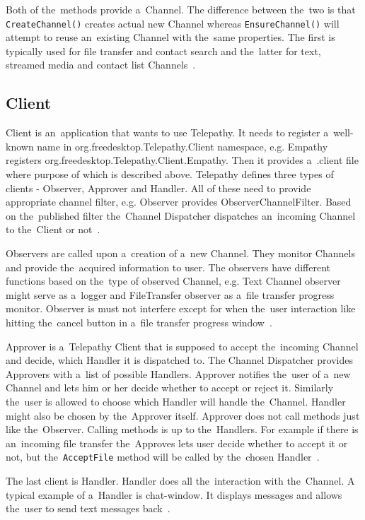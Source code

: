 Both of the~methods provide a~Channel. The difference between the~two is that \verb|CreateChannel()| creates actual new Channel whereas \verb|EnsureChannel()| will attempt to reuse an~existing Channel with the~same properties. The first is typically used for file transfer and contact search and the~latter for text, streamed media and contact list Channels~\cite{TPWiki}.

\subsection*{Client}\label{subsect:tpClient}
Client is an~application that wants to use Telepathy. It needs to register a~well-known name in org.freedesktop.Telepathy.Client namespace, e.g. Empathy registers \newline org.freedesktop.Telepathy.Client.Empathy. Then it provides a~.client file where purpose of which is described above. Telepathy defines three types of clients - Observer, Approver and Handler. All of these need to provide appropriate channel filter, e.g. Observer provides ObserverChannelFilter. Based on the~published filter the~Channel Dispatcher dispatches an~incoming Channel to the~Client or not~\cite{TPWiki}.  

Observers are called upon a~creation of a~new Channel. They monitor Channels and provide the~acquired information to user. The observers have different functions based on the~type of observed Channel, e.g. Text Channel observer might serve as a~logger and FileTransfer observer as a~file transfer progress monitor. Observer is must not interfere except for when the~user interaction like hitting the~cancel button in a~file transfer progress window~\cite{TPWiki}.

Approver is a~Telepathy Client that is supposed to accept the~incoming Channel and decide, which Handler it is dispatched to. The Channel Dispatcher provides Approvers with a~list of possible Handlers. Approver notifies the~user of a~new Channel and lets him or her decide whether to accept or reject it. Similarly the~user is allowed to choose which Handler will handle the~Channel. Handler might also be chosen by the~Approver itself. Approver does not call methods just like the~Observer. Calling methods is up to the~Handlers. For example if there is an~incoming file transfer the~Approves lets user decide whether to accept it or not, but the~\verb|AcceptFile| method will be called by the~chosen Handler~\cite{TPWiki}.  

The last client is Handler. Handler does all the~interaction with the~Channel. A typical example of a~Handler is chat-window. It displays messages and allows the~user to send text messages back~\cite{TPWiki}.  

